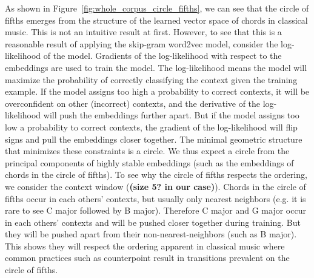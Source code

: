
As shown in Figure~\ref{fig:whole_corpus_circle_fifths}, we can see that the circle of fifths emerges from the structure of the learned vector space of chords in classical music.
This is not an intuitive result at first.
However, to see that this is a reasonable result of applying the skip-gram word2vec model, consider the log-likelihood of the model.
Gradients of the log-likelihood with respect to the embeddings are used to train the model.
The log-likelihood means the model will maximize the probability of correctly classifying the context given the training example.
If the model assigns too high a probability to correct contexts, it will be overconfident on other (incorrect) contexts, and the derivative of the log-likelihood will push the embeddings further apart.
But if the model assigns too low a probability to correct contexts, the gradient of the log-likelihood will flip signs and pull the embeddings closer together.
The minimal geometric structure that minimizes these constraints is a circle.
We thus expect a circle from the principal components of highly stable embeddings (such as the embeddings of chords in the circle of fifths).
To see why the circle of fifths respects the ordering, we consider the context window (\textbf{(size 5? in our case)}).
Chords in the circle of fifths occur in each others' contexts, but usually only nearest neighbors (e.g. it is rare to see C major followed by B major).
Therefore C major and G major occur in each others' contexts and will be pushed closer together during training.
But they will be pushed apart from their non-nearest-neighbors (such as B major).
This shows they will respect the ordering apparent in classical music where common practices such as counterpoint result in transitions prevalent on the circle of fifths.
